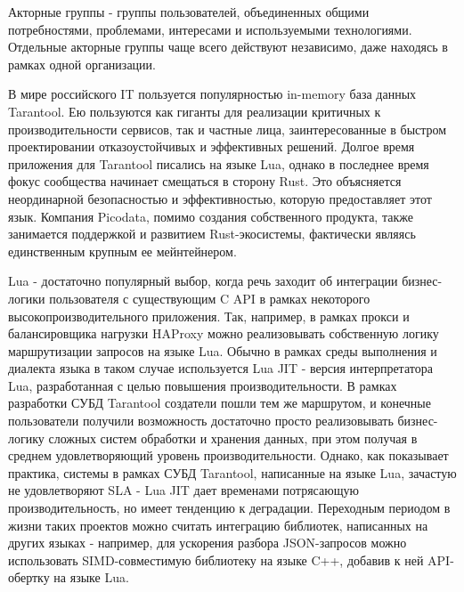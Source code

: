 \documentclass[times,numbers=noenddot]{itmo-student-thesis}
\begin{document}
Акторные группы - группы пользователей, объединенных общими потребностями, проблемами, интересами и используемыми технологиями.
Отдельные акторные группы чаще всего действуют независимо, даже находясь в рамках одной организации.


\startprefacepage

В мире российского IT пользуется популярностью in-memory база данных Tarantool.
Ею пользуются как гиганты для реализации критичных к производительности сервисов, так и частные лица, заинтересованные в быстром проектировании отказоустойчивых и эффективных решений.
Долгое время приложения для Tarantool писались на языке Lua, однако в последнее время фокус сообщества начинает смещаться в сторону Rust.
Это объясняется неординарной безопасностью и эффективностью, которую предоставляет этот язык.
Компания Picodata, помимо создания собственного продукта, также занимается поддержкой и развитием Rust-экосистемы, фактически являясь единственным крупным ее мейнтейнером.

Lua - достаточно популярный выбор, когда речь заходит об интеграции бизнес-логики пользователя с существующим C API в рамках некоторого высокопроизводительного приложения.
Так, например, в рамках прокси и балансировщика нагрузки HAProxy можно реализовывать собственную логику маршрутизации запросов на языке Lua.
Обычно в рамках среды выполнения и диалекта языка в таком случае используется Lua JIT - версия интерпретатора Lua, разработанная с целью повышения производительности.
В рамках разработки СУБД Tarantool создатели пошли тем же маршрутом, и конечные пользователи получили возможность достаточно просто реализовывать бизнес-логику сложных систем обработки и хранения данных, при этом получая в среднем удовлетворяющий уровень производительности.
Однако, как показывает практика, системы в рамках СУБД Tarantool, написанные на языке Lua, зачастую не удовлетворяют SLA - Lua JIT дает временами потрясающую производительность, но имеет тенденцию к деградации.
Переходным периодом в жизни таких проектов можно считать интеграцию библиотек, написанных на других языках - например, для ускорения разбора JSON-запросов можно использовать SIMD-совместимую библиотеку на языке C++, добавив к ней API-обертку на языке Lua.
\end{document}
